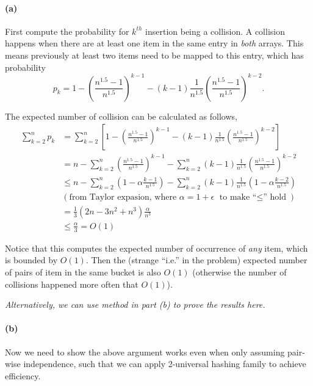 \documentclass[12pt]{article}
\begin{document}
\paragraph{(a)}
First compute the probability for $k^{th}$ insertion being a collision. A collision happens when there are at least one item in the same entry in \emph{both} arrays. This means previously at least two items need to be mapped to this entry, which has probability $$p_k = 1 - \left(\frac{n^{1.5} - 1}{n^{1.5}}\right)^{k-1} - (k-1) \frac{1}{n^{1.5}}\left(\frac{n^{1.5}-1}{n^{1.5}}\right)^{k-2}.$$

The expected number of collision can be calculated as follows, 
\begin{align*}
\sum_{k=2}^n p_k &= \sum_{k=2}^n \left[1 - \left(\frac{n^{1.5} - 1}{n^{1.5}}\right)^{k-1} - (k-1) \frac{1}{n^{1.5}}\left(\frac{n^{1.5}-1}{n^{1.5}}\right)^{k-2}\right]\\
&= n - \sum_{k=2}^{n} \left(\frac{n^{1.5} - 1}{n^{1.5}}\right)^{k-1} - \sum_{k=2}^{n}(k-1) \frac{1}{n^{1.5}}\left(\frac{n^{1.5}-1}{n^{1.5}}\right)^{k-2}\\
&\leq n - \sum_{k=2}^{n}\left( 1 - \alpha\frac{k-1}{n^{1.5}}\right) - \sum_{k=2}^{n}(k-1)\frac{1}{n^{1.5}}\left(1-\alpha\frac{k-2}{n^{1.5}}\right)\\
&(\text{from Taylor expasion, where } \alpha = 1 + \epsilon \text{ to make ``$\leq$'' hold})\\
& = \frac{1}{3} (2n - 3n^2 + n^3) \frac{\alpha}{n^3}\\
&\leq \frac{\alpha}{3} = O(1)
\end{align*}

Notice that this computes the expected number of occurrence of \emph{any} item, which is bounded by $O(1)$. Then the (strange ``i.e.'' in the problem) expected number of pairs of item in the same bucket is also $O(1)$ (otherwise the number of collisions happened more often that $O(1)$).

\emph{Alternatively, we can use method in part (b) to prove the results here.}
\paragraph{(b)}


Now we need to show the above argument works even when only assuming pair-wise independence, such that we can apply 2-universal hashing family to achieve efficiency. 
\end{document}
